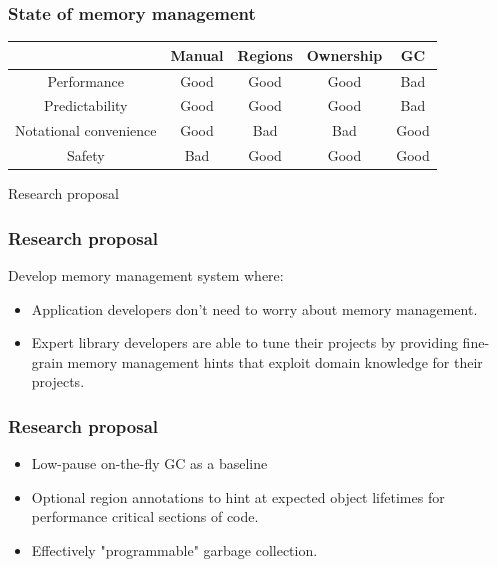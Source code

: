 \begin{frame}
    \frametitle{State of memory management}
    \newcommand{\Best}{{\color{seagreen} Good}}
    \newcommand{\Worst}{{\color{alizarin} Bad}}
    \begin{center}
        \begin{tabular}{c | c | c | c | c}
                                   & Manual & Regions & Ownership & GC     \\
                                   \hline
            Performance            & \Best  & \Best   & \Best     & \Worst \\
            Predictability         & \Best  & \Best   & \Best     & \Worst \\
            Notational convenience & \Best  & \Worst  & \Worst    & \Best  \\
            Safety                 & \Worst & \Best   & \Best     & \Best

        \end{tabular}
    \end{center}
\end{frame}

\begin{frame}
    \begin{center}
        {\LARGE Research proposal}
    \end{center}
\end{frame}

\begin{frame}
    \frametitle{Research proposal}
    Develop memory management system where:
    \begin{itemize}
        \item
            Application developers don't need to worry about memory
            management.
        \item
            Expert library developers are able to tune their projects
            by providing fine-grain memory management hints that
            exploit domain knowledge for their projects.
    \end{itemize}
\end{frame}


\begin{frame}
    \frametitle{Research proposal}
    \begin{itemize}
        \item
            Low-pause on-the-fly GC as a baseline
        \item
            Optional region annotations to hint at
            expected object lifetimes for performance
            critical sections of code.
        \item
            Effectively "programmable" garbage collection.
    \end{itemize}
\end{frame}
